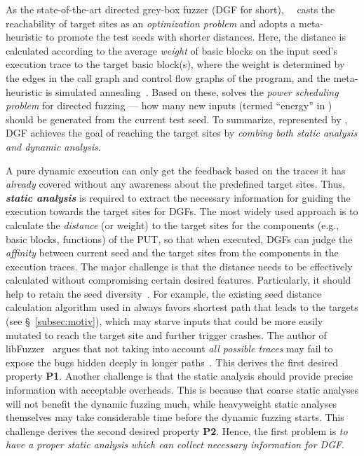 As the state-of-the-art directed grey-box fuzzer (DGF for short), {\aflgo}~\cite{Bohme:2017:DGF}~casts the reachability of target sites as an \emph{optimization problem} and adopts a meta-heuristic to promote the test seeds with shorter distances.
Here, the distance is calculated according to the average \emph{weight} of basic blocks on the input seed's execution trace to the target basic block(s), where the weight
 is determined by the edges in the call graph and control flow graphs of the program, and the meta-heuristic is simulated annealing~\cite{kirkpatrick1983optimization}.
Based on these, \aflgo solves the \emph{power scheduling problem} for directed fuzzing --- how many new inputs (termed ``energy'' in \aflgo) should be generated from the current test seed.
To summarize, represented by \aflgo, DGF achieves the goal of reaching the target sites by \emph{combing both static analysis and dynamic analysis}.


A pure dynamic execution can only get the feedback based on the traces it has \emph{already} covered without any awareness about the predefined target sites.
Thus, \textbf{\emph{static analysis}} is required to extract the necessary information for guiding the execution towards the target sites for DGFs. The most widely used approach is to calculate the \emph{distance} (or weight) to the target sites for the components (e.g., basic blocks, functions) of the PUT, so that when executed, DGFs can judge the \emph{affinity} between current seed and the target sites from the components in the execution traces. 
The major challenge is that the distance needs to be effectively calculated without compromising certain desired features.
Particularly, it should help to retain the seed diversity~\cite{Audibert09}.
For example, the existing seed distance calculation algorithm used in \aflgo always favors shortest path that leads to the targets (see \S~\ref{subsec:motiv}), which may starve inputs that could be more easily mutated to reach the target site and further trigger crashes.
The author of libFuzzer~\cite{libfuzzer} argues that not taking into account \emph{all possible traces} may fail to expose the bugs hidden deeply in longer paths~\cite{kcc_aflgo}.
This derives the first desired property \textbf{P1}.
Another challenge is that the static analysis should provide precise information with acceptable overheads.
This is because that coarse static analyses will not benefit the dynamic fuzzing much, while heavyweight static analyses themselves may take considerable time before the dynamic fuzzing starts.
This challenge derives the second desired property \textbf{P2}.
Hence, the first problem is \emph{to have a proper static analysis which can collect necessary information for DGF}.

